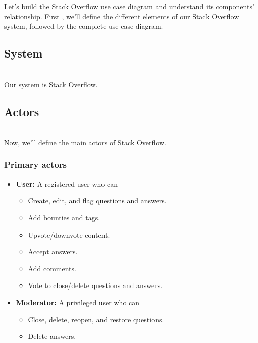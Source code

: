 

Let's build the Stack Overflow use case diagram and understand its components' relationship. First , we'll define the different elements of our Stack Overflow system, followed by the complete use case diagram.

\subsection{System}\label{vbJ8VWG2gx0eUXyggdhvB}
\\
Our system is Stack Overflow.

\subsection{Actors}\label{SJq1WEROQkxai3INR_Hc4}
\\
Now, we'll define the main actors of Stack Overflow.

\subsubsection{Primary actors}\label{m9EG8iuRfRtsaPDo__W8d}

\begin{itemize}
\item
\textbf{User:} A registered user who can

\begin{itemize}
\item
Create, edit, and flag questions and answers.
\item
Add bounties and tags.
\item
Upvote/downvote content.
\item
Accept answers.
\item
Add comments.
\item
Vote to close/delete questions and answers.
\end{itemize}
\item
\textbf{Moderator:} A privileged user who can

\begin{itemize}
\item
Close, delete, reopen, and restore questions.
\item
Delete answers.
\end{itemize}
\end{itemize}

